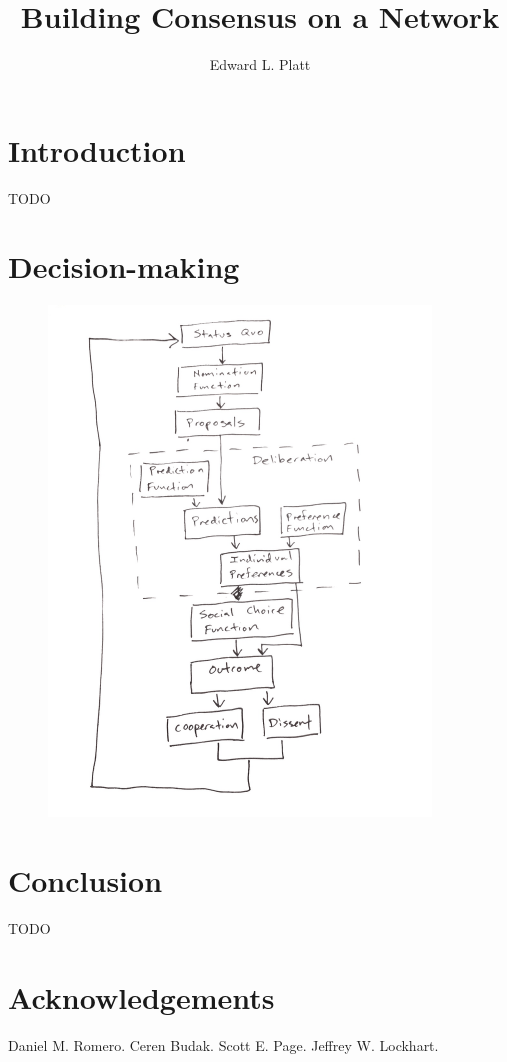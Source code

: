 \documentclass{book}
\author{Edward L. Platt}
\title{Building Consensus on a Network}
\begin{document}
\maketitle

\chapter{Introduction}
TODO

\chapter{Decision-making}

\begin{figure}
\centering
\includegraphics[width=4in]{images/decision-flow.png}
\end{figure}

\chapter{Conclusion}
TODO

\chapter{Acknowledgements}
Daniel M. Romero.
Ceren Budak.
Scott E. Page.
Jeffrey W. Lockhart.



\end{document}
